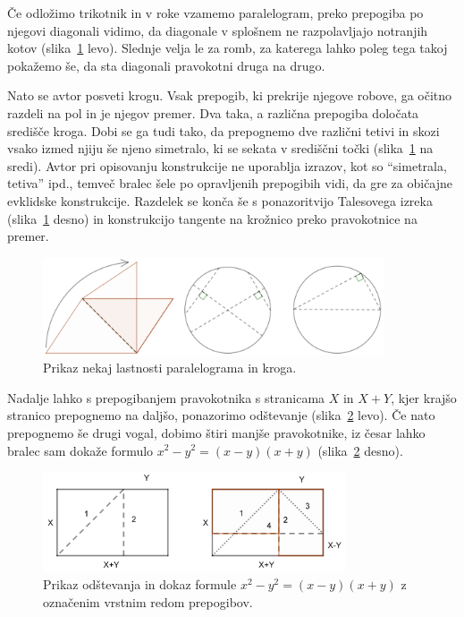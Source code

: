 Če odložimo trikotnik in v roke vzamemo paralelogram, preko prepogiba po njegovi diagonali vidimo, da diagonale v splošnem ne razpolavljajo notranjih kotov (slika~\ref{fig:par_krog_vec_lastnosti} levo). Slednje velja le za romb, za katerega lahko poleg tega takoj pokažemo še, da sta diagonali pravokotni druga na drugo.

Nato se avtor posveti krogu. Vsak prepogib, ki prekrije njegove robove, ga očitno razdeli na pol in je njegov premer. Dva taka, a različna prepogiba določata središče kroga. Dobi se ga tudi tako, da prepognemo dve različni tetivi in skozi vsako izmed njiju še njeno simetralo, ki se sekata v središčni točki (slika~\ref{fig:par_krog_vec_lastnosti} na sredi). Avtor pri opisovanju konstrukcije ne uporablja izrazov, kot so ``simetrala, tetiva'' ipd., temveč bralec šele po opravljenih prepogibih vidi, da gre za običajne evklidske konstrukcije. Razdelek se konča še s ponazoritvijo Talesovega izreka (slika~\ref{fig:par_krog_vec_lastnosti} desno) in konstrukcijo tangente na krožnico preko pravokotnice na premer.

\begin{figure}[h]
    \centering
    \includegraphics[width=0.9\textwidth]{images/osnovnosolski_prikazi/vec_lastnosti2.png}
    \caption[Pregibi kot dokaz lastnosti paralelograma in kroga]{Prikaz nekaj lastnosti paralelograma in kroga.}
    \label{fig:par_krog_vec_lastnosti}
\end{figure}

Nadalje lahko s prepogibanjem pravokotnika s stranicama $X$ in $X+Y$, kjer krajšo stranico prepognemo na daljšo, ponazorimo odštevanje (slika~\ref{fig:pravok_racunanje} levo). Če nato prepognemo še drugi vogal, dobimo štiri manjše pravokotnike, iz česar lahko bralec sam dokaže formulo $x^2-y^2 = (x-y)(x+y)$ (slika~\ref{fig:pravok_racunanje} desno).

\begin{figure}[h]
    \centering
    \includegraphics[width=0.8\textwidth]{images/osnovnosolski_prikazi/racunanje.png}
    \caption[Pregibi kot računanje]{Prikaz odštevanja in dokaz formule $x^2-y^2 = (x-y)(x+y)$ z označenim vrstnim redom prepogibov.}
    \label{fig:pravok_racunanje}
\end{figure}

